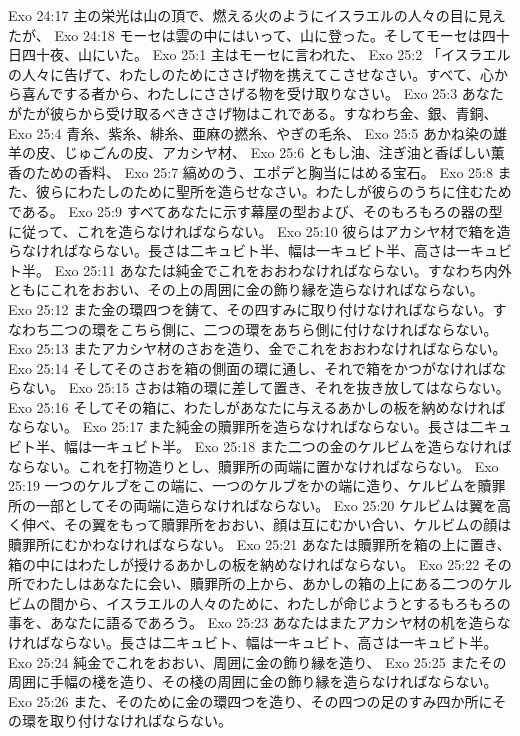 Exo 24:17  主の栄光は山の頂で、燃える火のようにイスラエルの人々の目に見えたが、
Exo 24:18  モーセは雲の中にはいって、山に登った。そしてモーセは四十日四十夜、山にいた。
Exo 25:1  主はモーセに言われた、
Exo 25:2  「イスラエルの人々に告げて、わたしのためにささげ物を携えてこさせなさい。すべて、心から喜んでする者から、わたしにささげる物を受け取りなさい。
Exo 25:3  あなたがたが彼らから受け取るべきささげ物はこれである。すなわち金、銀、青銅、
Exo 25:4  青糸、紫糸、緋糸、亜麻の撚糸、やぎの毛糸、
Exo 25:5  あかね染の雄羊の皮、じゅごんの皮、アカシヤ材、
Exo 25:6  ともし油、注ぎ油と香ばしい薫香のための香料、
Exo 25:7  縞めのう、エポデと胸当にはめる宝石。
Exo 25:8  また、彼らにわたしのために聖所を造らせなさい。わたしが彼らのうちに住むためである。
Exo 25:9  すべてあなたに示す幕屋の型および、そのもろもろの器の型に従って、これを造らなければならない。
Exo 25:10  彼らはアカシヤ材で箱を造らなければならない。長さは二キュビト半、幅は一キュビト半、高さは一キュビト半。
Exo 25:11  あなたは純金でこれをおおわなければならない。すなわち内外ともにこれをおおい、その上の周囲に金の飾り縁を造らなければならない。
Exo 25:12  また金の環四つを鋳て、その四すみに取り付けなければならない。すなわち二つの環をこちら側に、二つの環をあちら側に付けなければならない。
Exo 25:13  またアカシヤ材のさおを造り、金でこれをおおわなければならない。
Exo 25:14  そしてそのさおを箱の側面の環に通し、それで箱をかつがなければならない。
Exo 25:15  さおは箱の環に差して置き、それを抜き放してはならない。
Exo 25:16  そしてその箱に、わたしがあなたに与えるあかしの板を納めなければならない。
Exo 25:17  また純金の贖罪所を造らなければならない。長さは二キュビト半、幅は一キュビト半。
Exo 25:18  また二つの金のケルビムを造らなければならない。これを打物造りとし、贖罪所の両端に置かなければならない。
Exo 25:19  一つのケルブをこの端に、一つのケルブをかの端に造り、ケルビムを贖罪所の一部としてその両端に造らなければならない。
Exo 25:20  ケルビムは翼を高く伸べ、その翼をもって贖罪所をおおい、顔は互にむかい合い、ケルビムの顔は贖罪所にむかわなければならない。
Exo 25:21  あなたは贖罪所を箱の上に置き、箱の中にはわたしが授けるあかしの板を納めなければならない。
Exo 25:22  その所でわたしはあなたに会い、贖罪所の上から、あかしの箱の上にある二つのケルビムの間から、イスラエルの人々のために、わたしが命じようとするもろもろの事を、あなたに語るであろう。
Exo 25:23  あなたはまたアカシヤ材の机を造らなければならない。長さは二キュビト、幅は一キュビト、高さは一キュビト半。
Exo 25:24  純金でこれをおおい、周囲に金の飾り縁を造り、
Exo 25:25  またその周囲に手幅の棧を造り、その棧の周囲に金の飾り縁を造らなければならない。
Exo 25:26  また、そのために金の環四つを造り、その四つの足のすみ四か所にその環を取り付けなければならない。
